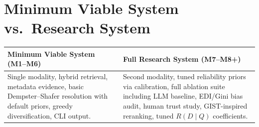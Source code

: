 \documentclass[11pt]{article}
\begin{document}
\section{Minimum Viable System vs.\ Research System}
\begin{table}[h]
\centering
\small
\begin{tabular}{@{}p{5.2cm}p{5.2cm}@{}}
\toprule
\textbf{Minimum Viable System (M1--M6)} & \textbf{Full Research System (M7--M8+)} \\
\midrule
Single modality, hybrid retrieval, metadata evidence, basic Dempster--Shafer resolution with default
priors, greedy diversification, CLI output. &
Second modality, tuned reliability priors via calibration, full ablation suite including LLM baseline,
EDI/Gini bias audit, human trust study, GIST-inspired reranking, tuned $R(D\mid Q)$ coefficients. \\
\bottomrule
\end{tabular}
\end{table}

\end{document}
